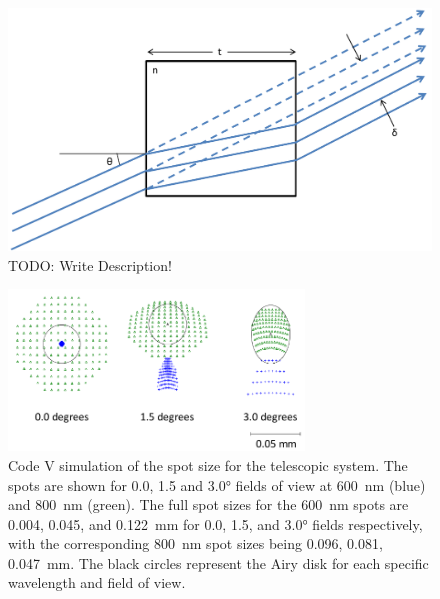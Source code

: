 \begin{figure}[h!]
    \begin{center}
    \includegraphics[width=1.0\textwidth]{./Images/3-2-PlaneParallelDisplacement.pdf}
    \caption[Telescoptic Plane Parallel Displacement]{TODO: Write Description!}
    \label{fig:3.2:planeParallelDiplacement}
    \end{center}
\end{figure}

\begin{figure}[!h]
    \begin{center}
    \includegraphics[width=0.70\textwidth]{./Images/3-2-TelescopicSpotSize.pdf}
    \caption[Telescopic Prototype Spot Sizes]{Code V simulation of the spot size for the telescopic system. The spots are shown for 0.0, 1.5 and 3.0\si{\degree} fields of view at 600~nm (blue) and 800~nm (green). The full spot sizes for the 600~nm spots are 0.004, 0.045, and 0.122~mm for 0.0, 1.5, and 3.0\si{\degree} fields respectively, with the corresponding 800~nm spot sizes being 0.096, 0.081, 0.047~mm. The black circles represent the Airy disk for each specific wavelength and field of view.}
    \label{fig:3.2:telescopicSpotSize}
    \end{center}
\end{figure}

